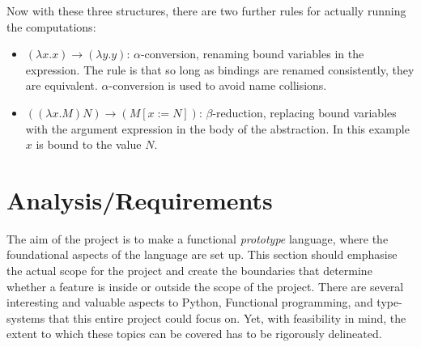 \documentclass{l4proj}
\begin{document}
Now with these three structures, there are two further rules for actually running the computations:
\begin{itemize}
    \item $(\lambda x . x) \rightarrow (\lambda y . y)$: $\alpha$-conversion, renaming bound variables in the expression. The rule is that so long as bindings are renamed consistently, they are equivalent. $\alpha$-conversion is used to avoid name collisions.
    \item $((\lambda x . M) N) \rightarrow (M [x := N])$: $\beta$-reduction, replacing bound variables with the argument expression in the body of the abstraction. In this example $x$ is bound to the value $N$.
\end{itemize}


\chapter{Analysis/Requirements}
\label{chp:analysis-requirements}



The aim of the project is to make a functional \emph{prototype} language, where the foundational aspects of the language are set up.
This section should emphasise the actual scope for the project and create the boundaries that determine whether a feature is inside or outside the scope of the project.
There are several interesting and valuable aspects to Python, Functional programming, and type-systems that this entire project could focus on.
Yet, with feasibility in mind, the extent to which these topics can be covered has to be rigorously delineated.
\end{document}
